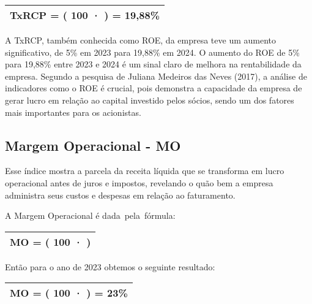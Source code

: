 \documentclass[1pt,a4paper]{article}
\begin{document}
	\begin{center}
		\begin{tabular}{|c|}
			\hline
			TxRCP = \left( 100 · \left[ \frac{650.143}{3.270.213} \right] \right) = 19,88\% \\
			\hline
		\end{tabular}
	\end{center}

	A TxRCP, também conhecida como ROE, da empresa teve um aumento significativo, de 5\% em 2023 para 19,88\% em 2024. O aumento do ROE de 5\% para 19,88\% entre 2023 e 2024 é um sinal claro de melhora na rentabilidade da empresa.  Segundo a pesquisa de Juliana Medeiros das Neves (2017), a análise de indicadores como o ROE é crucial, pois demonstra a capacidade da empresa de gerar lucro em relação ao capital investido pelos sócios, sendo um dos fatores mais importantes para os acionistas.



	\subsection{Margem Operacional - MO}
	
	\hspace*{1.5cm} Esse índice mostra a parcela da receita líquida que se transforma em lucro operacional antes de juros e impostos, revelando o quão bem a empresa administra seus custos e despesas em relação ao faturamento. 
	 

	 
	 A Margem Operacional é dada pela fórmula:

		\begin{center}
			\begin{tabular}{|c|}
				\hline
				MO = \left( 100 · \left[ \frac{LUCRO \, OPERACIONAL}{ RECEITA \, LÍQUIDA} \right] \right)  \\
				\hline
			\end{tabular}
		\end{center}
		
	Então para o ano de 2023 obtemos o seguinte resultado: 
	
		\begin{center}
			\begin{tabular}{|c|}
				\hline
				MO = \left( 100 · \left[ \frac{713.652}{3.075.471} \right] \right) = 23\% \\
				\hline
			\end{tabular}
		\end{center}
		
\end{document}

